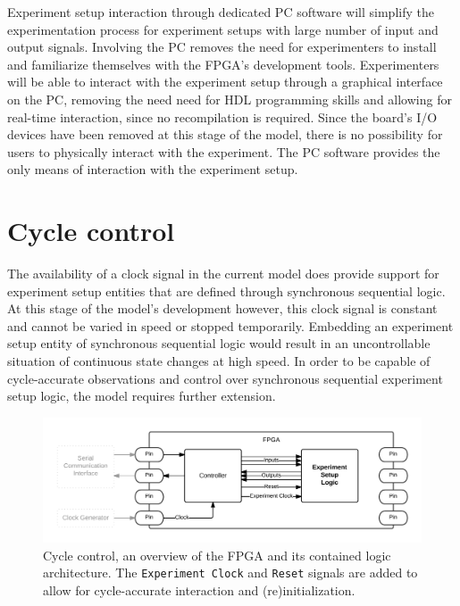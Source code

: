 \documentclass[main.tex]{subfiles}
\begin{document}
Experiment setup interaction through dedicated PC software will simplify the experimentation process for experiment setups with large number of input and output signals. Involving the PC removes the need for experimenters to install and familiarize themselves with the FPGA's development tools. Experimenters will be able to interact with the experiment setup through a graphical interface on the PC, removing the need need for HDL programming skills and allowing for real-time interaction, since no recompilation is required. Since the board's I/O devices have been removed at this stage of the model, there is no possibility for users to physically interact with the experiment. The PC software provides the only means of interaction with the experiment setup.


\section{Cycle control}



\label{sectioncyclecontrol}

The availability of a clock signal in the current model does provide support for experiment setup entities that are defined through synchronous sequential logic. At this stage of the model's development however, this clock signal is constant and cannot be varied in speed or stopped temporarily. Embedding an experiment setup entity of synchronous sequential logic would result in an uncontrollable situation of continuous state changes at high speed. In order to be capable of cycle-accurate observations and control over synchronous sequential experiment setup logic, the model requires further extension.

\begin{figure}[h]
\centering
\caption{Cycle control, an overview of the FPGA and its contained logic architecture. The \texttt{Experiment Clock} and \texttt{Reset} signals are added to allow for cycle-accurate interaction and (re)initialization.}
\label{fig:fpga-control}
\includegraphics[width=\textwidth]{img/fpga-control}
\end{figure}
\end{document}
